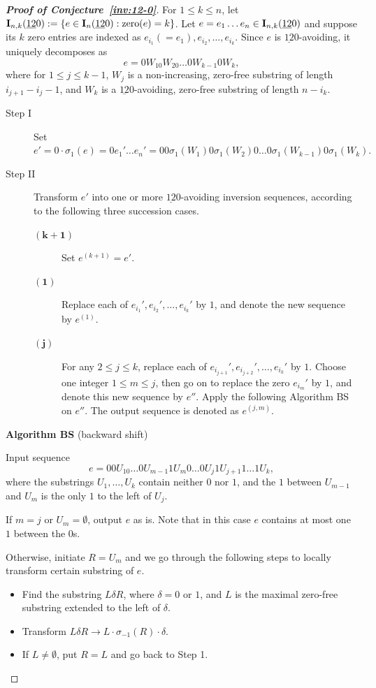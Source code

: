 \documentclass[12pt,A4]{amsart}
\numberwithin{equation}{section}
\theoremstyle{plain}
\theoremstyle{definition}
\def\zero{\mathrm{zero}}
\def\I{\operatorname{{\bf I}}}
\begin{document}
\begin{proof}[{\bf Proof of Conjecture~\ref{inv:12-0}}]
For $1\leq k\leq n$, let $\I_{n,k}(\underline{12}0):=\{e\in\I_n(\underline{12}0):\zero(e)=k\}$.
Let $e=e_1\ldots e_n\in\I_{n,k}(\underline{12}0)$ and suppose its $k$ zero entries are indexed as $e_{i_1}(=e_1),e_{i_2},\ldots,e_{i_k}$. Since $e$ is $\underline{12}0$-avoiding, it uniquely decomposes as $$e=0W_10W_20\ldots0W_{k-1}0W_k,$$ where for $1\le j\le k-1$, $W_j$ is a non-increasing, zero-free substring of length $i_{j+1}-i_j-1$, and $W_k$ is a $\underline{12}0$-avoiding, zero-free substring of length $n-i_k$.
\begin{description}
	\item[Step I] Set $e'=0\cdot\sigma_1(e)=0e_1'\ldots e_n'=00\sigma_1(W_1)0\sigma_1(W_2)0\ldots 0\sigma_1(W_{k-1})0\sigma_1(W_k).$
	\item[Step II] Transform $e'$ into one or more $\underline{12}0$-avoiding inversion sequences, according to the following three succession cases.
	\begin{description}
		\item[$\mathbf{(k+1)}$] Set $e^{(k+1)}=e'$.
		\item[$\mathbf{(1)}$] Replace each of $e_{i_1}',e_{i_2}',\ldots,e_{i_k}'$ by $1$, and denote the new sequence by $e^{(1)}$.
		\item[$\mathbf{(j)}$] For any $2\le j\le k$, replace each of $e_{i_{j+1}}',e_{i_{j+2}}',\ldots,e_{i_k}'$ by $1$. Choose one integer $1\le m\le j$, then go on to replace the zero $e_{i_m}'$ by $1$, and denote this new sequence by $e''$. Apply the following Algorithm BS on $e''$. The output sequence is denoted as $e^{(j,m)}$.
	\end{description}
\end{description}
\begin{framed}
\begin{center}
 {\bf Algorithm BS} (backward shift)
\end{center}
\noindent Input sequence $$e=00U_10\ldots 0U_{m-1}1U_{m}0\ldots0U_j1U_{j+1}1\ldots1U_k,$$ where the substrings $U_1,\ldots,U_k$ contain neither $0$ nor $1$, and the $1$ between $U_{m-1}$ and $U_m$ is the only $1$ to the left of $U_j$.

If $m=j$ or $U_m=\emptyset$, output $e$ as is. Note that in this case $e$ contains at most one $1$ between the $0$s.

Otherwise, initiate $R=U_m$ and we go through the following steps to locally transform certain substring of $e$. 
\begin{itemize}
	\item[Step 1] Find the substring $L\delta R$, where $\delta=0$ or $1$, and $L$ is the maximal zero-free substring extended to the left of $\delta$.
	\item[Step 2] Transform $L\delta R\rightarrow L\cdot\sigma_{-1}(R)\cdot\delta$. 
    \item[Step 3] If $L\neq\emptyset$, put $R=L$ and go back to Step 1.
 

\end{itemize}
\end{framed}
\end{proof}
\end{document}
